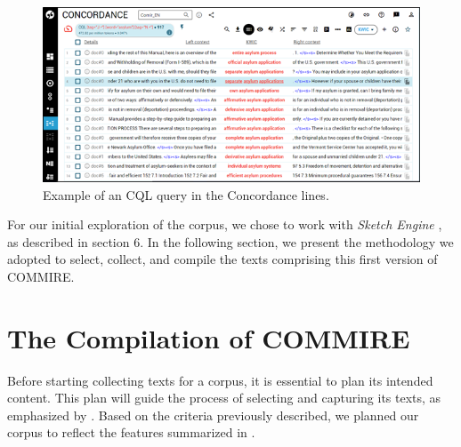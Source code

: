 \documentclass[english]{textolivre}
\begin{document}
\begin{description}
\begin{figure}[htbp]
\centering
\includegraphics[width=\textwidth]{Figura02.png}
\caption{Example of an CQL query in the Concordance lines.}
\label{Figura02}
\end{figure}


\end{description}

For our initial exploration of the corpus, we chose to work with \textit{Sketch Engine} \cite{kilgarriff_sketch_2004}, as described in section 6. In the following section, we present the methodology we adopted to select, collect, and compile the texts comprising this first version of COMMIRE.

\section{The Compilation of COMMIRE}

Before starting collecting texts for a corpus, it is essential to plan its intended content. This plan will guide the process of selecting and capturing its texts, as emphasized by \textcite{bowker_working_2002,teixeira_linguistica_2008}. Based on the criteria previously described, we planned our corpus to reflect the features summarized in .
\end{document}
